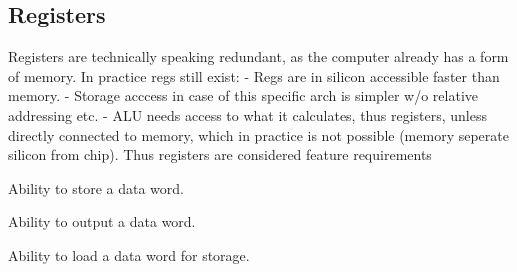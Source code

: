 \subsection{Registers}

Registers are technically speaking redundant, as the computer already has a form of memory. In practice regs still exist: 
- Regs are in silicon accessible faster than memory. 
- Storage acccess in case of this specific arch is simpler w/o relative addressing etc. 
- ALU needs access to what it calculates, thus registers, unless directly connected to memory, which in practice is not possible (memory seperate silicon from chip). 
Thus registers are considered feature requirements

\begin{feat-requirement}
  Ability to store a data word.
\end{feat-requirement}

\begin{feat-requirement}
  Ability to output a data word.
\end{feat-requirement}

\begin{turing-requirement}
  Ability to load a data word for storage.
\end{turing-requirement}
